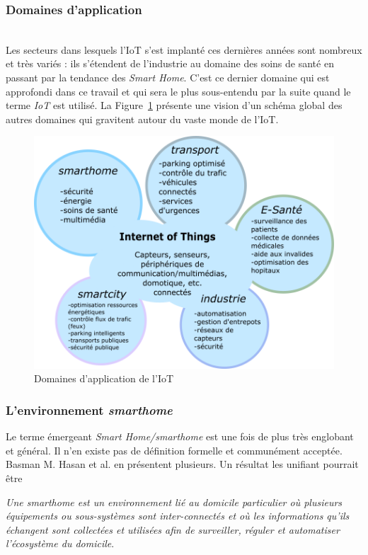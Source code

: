\documentclass[]{article}
\begin{document}
\subsubsection{Domaines d'application}
~\\
Les secteurs dans lesquels l'IoT s'est implanté ces dernières années sont nombreux et très variés : ils s'étendent de l'industrie au domaine des soins de santé en passant par la tendance des \textit{Smart Home}. C'est ce dernier domaine qui est approfondi dans ce travail et qui sera le plus sous-entendu par la suite quand le terme \textit{IoT} est utilisé. La Figure~\ref{domains_IoT} présente une vision d'un schéma global des autres domaines qui gravitent autour du vaste monde de l'IoT.\\


\begin{figure}[!h]
\centering
\includegraphics[width=0.65\linewidth]{IoT_domains.png}
\caption{Domaines d'application de l'IoT}
\label{domains_IoT}
\end{figure}

\newpage

\subsubsection{L'environnement \textit{smarthome}}
\par Le terme émergeant \textit{Smart Home/smarthome} est une fois de plus très englobant et général. Il n'en existe pas de définition formelle et communément acceptée. Basman M. Hasan et al. \cite{Basman2016} en présentent plusieurs. Un résultat les unifiant pourrait être
\begin{center}
 \textit{\og Une smarthome est un environnement lié au domicile particulier où plusieurs équipements ou sous-systèmes sont inter-connectés et où les informations qu'ils échangent sont collectées et utilisées afin de surveiller, réguler et automatiser l'écosystème du domicile\fg{}}.\\
\end{center}
\end{document}
